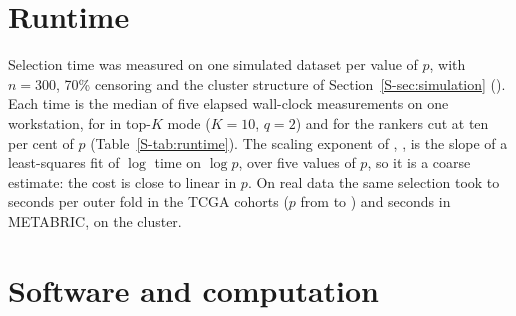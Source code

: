 \section{Runtime}\label{S-sec:runtime}

Selection time was measured on one simulated dataset per value of $p$, with $n = 300$,
70\% censoring and the cluster structure of Section~\ref{S-sec:simulation}
(). Each time is the median of five elapsed wall-clock
measurements on one workstation, for  in top-$K$ mode ($K = 10$, $q = 2$)
and for the rankers cut at ten per cent of $p$ (Table~\ref{S-tab:runtime}). The scaling
exponent of , \SuppRuntimeExponent, is the slope of a least-squares fit of
$\log$ time on $\log p$, over five values of $p$, so it is a coarse estimate: the cost is
close to linear in $p$. On real data the same selection took \SuppRealTimeMin{} to
\SuppRealTimeMax{} seconds per outer fold in the TCGA cohorts ($p$ from \SuppRealPMin{} to
\SuppRealPMax) and \SuppMetabricTime{} seconds in METABRIC, on the cluster.

\begin{table}[htbp]
\centering\footnotesize
\caption{Selection time in seconds by number of features, $n = 300$.}
\label{S-tab:runtime}

\end{table}

\section{Software and computation}\label{S-sec:software}

